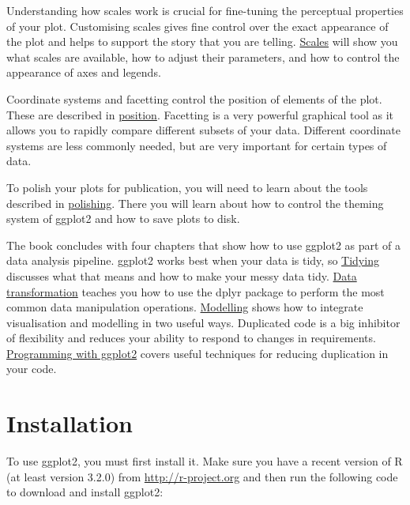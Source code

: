 Understanding how scales work is crucial for fine-tuning the perceptual
properties of your plot. Customising scales gives fine control over the
exact appearance of the plot and helps to support the story that you are
telling. \protect\hyperlink{cha:scales}{Scales} will show you what
scales are available, how to adjust their parameters, and how to control
the appearance of axes and legends.

Coordinate systems and facetting control the position of elements of the
plot. These are described in \protect\hyperlink{cha:position}{position}.
Facetting is a very powerful graphical tool as it allows you to rapidly
compare different subsets of your data. Different coordinate systems are
less commonly needed, but are very important for certain types of data.

To polish your plots for publication, you will need to learn about the
tools described in \protect\hyperlink{cha:polishing}{polishing}. There
you will learn about how to control the theming system of ggplot2 and
how to save plots to disk.

The book concludes with four chapters that show how to use ggplot2 as
part of a data analysis pipeline. ggplot2 works best when your data is
tidy, so \protect\hyperlink{cha:data}{Tidying} discusses what that means
and how to make your messy data tidy. \protect\hyperlink{cha:dplyr}{Data
transformation} teaches you how to use the dplyr package to perform the
most common data manipulation operations.
\protect\hyperlink{cha:modelling}{Modelling} shows how to integrate
visualisation and modelling in two useful ways. Duplicated code is a big
inhibitor of flexibility and reduces your ability to respond to changes
in requirements. \protect\hyperlink{cha:programming}{Programming with
ggplot2} covers useful techniques for reducing duplication in your code.

\hypertarget{sec:installation}{%
\section{Installation}\label{sec:installation}}


To use ggplot2, you must first install it. Make sure you have a recent
version of R (at least version 3.2.0) from \url{http://r-project.org}
and then run the following code to download and install ggplot2:

\begin{Shaded}
\begin{Highlighting}[]
\NormalTok{(}\NormalTok{)}
\end{Highlighting}
\end{Shaded}

